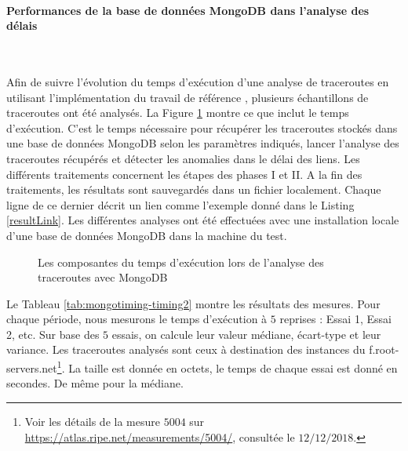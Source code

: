 \paragraph{Performances de la base de données MongoDB dans l'analyse des délais }~

Afin de suivre l'évolution du  temps d'exécution d'une analyse de traceroutes en utilisant l'implémentation du travail de référence \cite{InternetHealthReport}, plusieurs échantillons de traceroutes ont été analysés.
La Figure \ref{fig:mongodbmesuretime} montre ce que inclut le temps d'exécution. C'est le temps nécessaire pour récupérer les traceroutes stockés dans une base de données MongoDB selon les paramètres indiqués,  lancer  l'analyse des traceroutes récupérés et détecter les anomalies dans le délai des liens.
 Les différents traitements concernent les étapes des  phases I et II. A la fin des traitements, les résultats sont  sauvegardés dans un fichier localement. Chaque ligne de ce dernier  décrit un lien comme l'exemple donné dans le Listing \ref{resultLink}. 
Les différentes analyses ont été effectuées avec une installation locale  d'une base de données MongoDB dans la machine du test.
\begin{figure}[H]
	\centering
	\captionsetup{justification=centering}
	\resizebox{\textwidth}{!}{
		
	}
	\caption{Les composantes du temps d'exécution lors de l'analyse des traceroutes avec MongoDB }
	\label{fig:mongodbmesuretime}
\end{figure}


 

Le Tableau \ref{tab:mongotiming-timing2} montre les résultats des mesures. Pour chaque période, nous mesurons le temps d'exécution à  $5$ reprises
: Essai 1, Essai 2, etc. Sur base des $5$ essais, on calcule leur valeur médiane, écart-type et leur variance.
 Les traceroutes analysés sont ceux à destination des instances du f.root-servers.net\footnote{Voir les détails de la mesure $ 5004 $ sur \url{https://atlas.ripe.net/measurements/5004/}, consultée le $12/12/2018$.}. La taille est donnée en octets, le temps de chaque essai est donné en secondes. De même pour la médiane.

